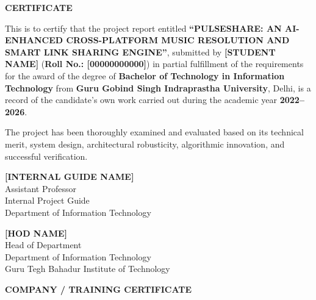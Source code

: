 \documentclass[12pt,a4paper]{report}
\newcommand{\projectTitle}{PULSESHARE: AN AI-ENHANCED CROSS-PLATFORM MUSIC RESOLUTION AND SMART LINK SHARING ENGINE}
\newcommand{\studentName}{[STUDENT NAME]}
\newcommand{\studentRoll}{[00000000000]}
\newcommand{\degreeName}{Bachelor of Technology in Information Technology}
\newcommand{\departmentName}{Department of Information Technology}
\newcommand{\instituteName}{Guru Tegh Bahadur Institute of Technology}
\newcommand{\universityName}{Guru Gobind Singh Indraprastha University}
\newcommand{\academicYear}{2022--2026}
\newcommand{\internalGuide}{[INTERNAL GUIDE NAME]}
\newcommand{\guideDesignation}{Assistant Professor}
\newcommand{\hodName}{[HOD NAME]}
\newcommand{\hodDesignation}{Head of Department}
\begin{document}
\newpage
\begin{center}
    {\fontsize{16}{20}\selectfont \textbf{CERTIFICATE}}
\end{center}
\vspace{1.2cm}

\noindent This is to certify that the project report entitled \textbf{``\projectTitle''}, submitted by \textbf{\studentName} (\textbf{Roll No.: \studentRoll}) in partial fulfillment of the requirements for the award of the degree of \textbf{\degreeName} from \textbf{\universityName}, Delhi, is a record of the candidate's own work carried out during the academic year \textbf{\academicYear}.

\vspace{0.8cm}
\noindent The project has been thoroughly examined and evaluated based on its technical merit, system design, architectural robusticity, algorithmic innovation, and successful verification.

\vspace{4.0cm}
\noindent
\begin{minipage}[t]{0.48\textwidth}
    \begin{flushleft}
        \textbf{\internalGuide}\\
        \guideDesignation\\
        Internal Project Guide\\
        \departmentName
    \end{flushleft}
\end{minipage}
\hfill
\begin{minipage}[t]{0.48\textwidth}
    \begin{flushright}
        \textbf{\hodName}\\
        \hodDesignation\\
        \departmentName\\
        \instituteName
    \end{flushright}
\end{minipage}
\clearpage

\newpage
\begin{center}
    {\fontsize{16}{20}\selectfont \textbf{COMPANY / TRAINING CERTIFICATE}}
\end{center}
\vspace{1.5cm}
\end{document}
